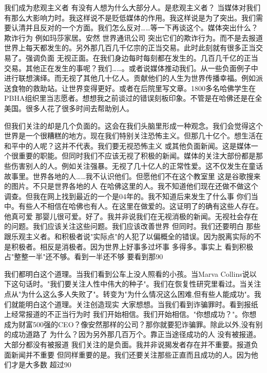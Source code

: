 我们成为悲观主义者 有没有人想为什么大部分人。是悲观主义者？ 当媒体对我们有那么大影响力时。我这样说不是贬低媒体的作用。我这样说是为了突出。我们需要认清并且反对的一个方面。我们怎么反对……等一下再谈这个。媒体突出什么？欺诈行为 例如玛莎家居。安然 世界通讯公司 突出它们的欺诈行为。而不是去报道世界上每天都发生的。另外那几百几千亿宗的正当交易。此时此刻就有很多正当交易了。强调负面 无视正面。在我们身边每时每刻都在发生的。几百几千亿的正当交易。其他正在发生的事呢？我们……。或者说媒体推动我们。从一些负面例子中进行联想演绎。而无视了其他几十亿人。贡献他们的人生为世界传播幸福。例如派送食物的救助站。让世界变得更好。或者在后院里写文章。1800多名哈佛学生在PBHA组织里当志愿者。想想我之前谈过的错误刻板印象。不管是在哈佛还是在全美国。很多人花了很多时间去帮助别人。 

但我们关注的却是几个负面的。这会在我们头脑里形成一种观念。我们会觉得这个世界是一个很糟糕的地方。现在我们特别关注恐怖主义。但那几十亿个。想生活在和平中的人呢？这并不代表。我们要无视恐怖主义 或其他负面新闻。这是媒体一个很重要的职能。但同时我们不应该无视了积极的新闻。媒体的关注大部份都是那些伤害别人的人。例如关注强暴。无视了几十亿人的正常性爱。这不仅发生在童话故事里。世界各地的人……我不认识他们。但愿他们不在这个教室里 这是谷歌搜来的图片。不只是世界各地的人 在哈佛这里的人。我不知道他们现在还做不做这个调查。但我在网上找到最近的一个是04年的。我不知道后来发生了什么事 你们当中。有些人不相信在哈佛也有人。在这里在做爱的。这证明了的确有这些人存在。他真可爱 那婴儿很可爱。好了。我并非说我们在无视消极的新闻。无视社会存在的问题。我们应该关注这些问题。我们应该改善世界 但同时。我们还要明白 那些跟乐观主义者。和积极者说"实际点"的人犯了以偏概全的错误。因为脱离实际的不是积极者。相反是消极者。因为世界上好事多过坏事 多得多。事实上 看到积极占"整整一半"还不够。看到一半还不够 要看到那90%

我们都明白这个道理。当我们看到公车上没人照看的小孩。当Marva Collins说以下这句话时。"我们要关注人性中伟大的种子"。我们在恢复性研究里看过。当关注点从"为什么这么多人失败了"。转变为"为什么情况这么困难,但有些人能成功"。我们就能明白这个道理。关注创造现实 大家想想。当我们看到诈骗罪时。看到报纸上经常报道的不正当行为时 我们开始相信。我们开始相信。"你想成功？"。你想成为财富500强的CEO？像安然那样的公司？那你就要犯诈骗罪。除此以外,没有别的成功道路了 为什么？因为另外那几百万个。靠正当途径成功的人 没有被报道。大部分都没有被报道 我们关注的是负面。我并非说揭发者存在并不重要。报道负面新闻并不重要 但同样重要的是。我们还要关注那些正直而且成功的人。因为他们才是大多数 超过90%


